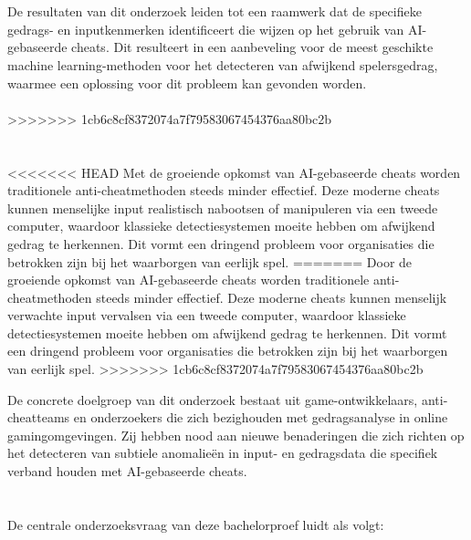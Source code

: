 \\\\
De resultaten van dit onderzoek leiden tot een raamwerk dat de specifieke gedrags- en inputkenmerken identificeert die wijzen op het gebruik van AI-gebaseerde cheats. Dit resulteert in een aanbeveling voor de meest geschikte machine learning-methoden voor het detecteren van afwijkend spelersgedrag, waarmee een oplossing voor dit probleem kan gevonden worden.
\\\\


>>>>>>> 1cb6c8cf8372074a7f79583067454376aa80bc2b

\section{}%
\label{sec:probleemstelling}

<<<<<<< HEAD
Met de groeiende opkomst van AI-gebaseerde cheats worden traditionele anti-cheatmethoden steeds minder effectief. Deze moderne cheats kunnen menselijke input realistisch nabootsen of manipuleren via een tweede computer, waardoor klassieke detectiesystemen moeite hebben om afwijkend gedrag te herkennen. Dit vormt een dringend probleem voor organisaties die betrokken zijn bij het waarborgen van eerlijk spel.  
=======
Door de groeiende opkomst van AI-gebaseerde cheats worden traditionele anti-cheatmethoden steeds minder effectief. Deze moderne cheats kunnen menselijk verwachte input vervalsen via een tweede computer, waardoor klassieke detectiesystemen moeite hebben om afwijkend gedrag te herkennen. Dit vormt een dringend probleem voor organisaties die betrokken zijn bij het waarborgen van eerlijk spel.  
>>>>>>> 1cb6c8cf8372074a7f79583067454376aa80bc2b

De concrete doelgroep van dit onderzoek bestaat uit game-ontwikkelaars, anti-cheatteams en onderzoekers die zich bezighouden met gedragsanalyse in online gamingomgevingen. Zij hebben nood aan nieuwe benaderingen die zich richten op het detecteren van subtiele anomalieën in input- en gedragsdata die specifiek verband houden met AI-gebaseerde cheats.

\section{}%
\label{sec:onderzoeksvraag}

De centrale onderzoeksvraag van deze bachelorproef luidt als volgt:

